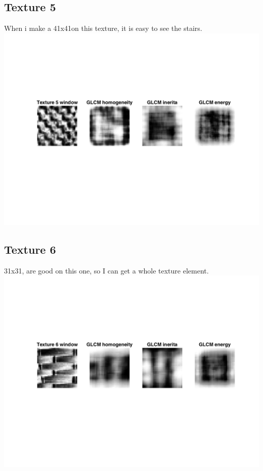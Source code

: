 \documentclass{article}
\begin{document}
\subsection{Texture 5}
When i make a 41x41on this texture, it is easy to see the stairs. \\
\includegraphics[trim=75 140 0 140,clip,totalheight=5cm]{tw5plot.png}
\subsection{Texture 6}
31x31, are good on this one, so I can get a whole texture element.\\ 
\includegraphics[trim=75 140 0 140,clip,totalheight=5cm]{tw6plot.png}
\end{document}
